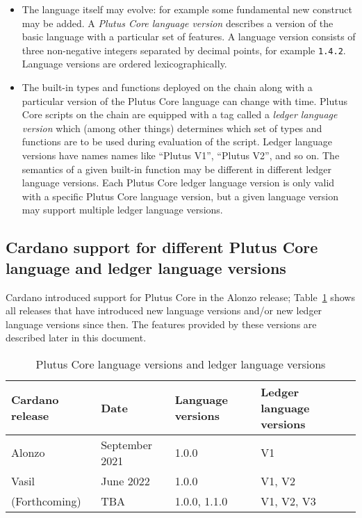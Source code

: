\begin{itemize}
\item The language itself may evolve: for example some fundamental new construct
  may be added.  A \textit{Plutus Core language version} describes a version of
  the basic language with a particular set of features. A language version
  consists of three non-negative integers separated by decimal points, for
  example \texttt{1.4.2}.  Language versions are ordered lexicographically.
\item The built-in types and functions deployed on the chain along with a
  particular version of the Plutus Core language can change with time.  Plutus
  Core scripts on the chain are equipped with a tag called a \textit{ledger
    language version} which (among other things) determines which set of types
  and functions are to be used during evaluation of the script.  Ledger language
  versions have names names like ``Plutus V1'', ``Plutus V2'', and so on.  The
  semantics of a given built-in function may be different in different ledger
  language versions.  Each Plutus Core ledger language version is only valid
  with a specific Plutus Core language version, but a given language version may
  support multiple ledger language versions.
\end{itemize}

\subsection{Cardano support for different Plutus Core language and ledger language versions}

Cardano introduced support for Plutus Core in the Alonzo release;
Table~\ref{table:versions} shows all releases that have introduced new language
versions and/or new ledger language versions since then.  The features provided
by these versions are described later in this document.
\begin{table}[H]
  \centering
    \begin{tabular}{|l|l|l|l|}
        \hline
        Cardano release & Date & Language versions & Ledger language versions \\
        \hline
        Alonzo & September 2021 & 1.0.0 & V1 \\
        Vasil & June 2022 & 1.0.0 & V1, V2 \\
        (Forthcoming) & TBA & 1.0.0, 1.1.0 & V1, V2, V3 \\
        \hline
    \end{tabular}
    \caption{Plutus Core language versions and ledger language versions}
    \label{table:versions}
\end{table}
   

